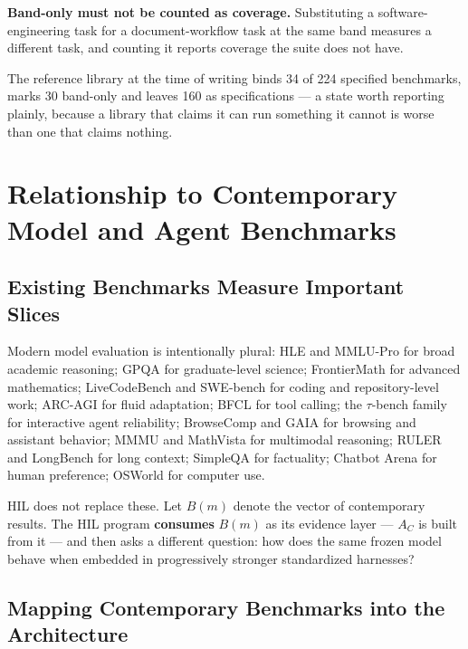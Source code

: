 \documentclass[11pt]{article}
\theoremstyle{definition}
\begin{document}
\textbf{Band-only must not be counted as coverage.} Substituting a software-engineering task for a document-workflow task at the same band measures a different task, and counting it reports coverage the suite does not have.

The reference library at the time of writing binds 34 of 224 specified benchmarks, marks 30 band-only and leaves 160 as specifications --- a state worth reporting plainly, because a library that claims it can run something it cannot is worse than one that claims nothing.

\section{Relationship to Contemporary Model and Agent Benchmarks}

\subsection{Existing Benchmarks Measure Important Slices}

Modern model evaluation is intentionally plural: HLE \citep{phan2025hle} and MMLU-Pro \citep{wang2024mmlupro} for broad academic reasoning; GPQA \citep{rein2023gpqa} for graduate-level science; FrontierMath \citep{glazer2024frontiermath} for advanced mathematics; LiveCodeBench \citep{jain2024livecodebench} and SWE-bench \citep{jimenez2023swebench} for coding and repository-level work; ARC-AGI \citep{arc2026} for fluid adaptation; BFCL \citep{patil2025bfcl} for tool calling; the $\tau$-bench family \citep{yao2024taubench} for interactive agent reliability; BrowseComp \citep{wei2025browsecomp} and GAIA \citep{mialon2023gaia} for browsing and assistant behavior; MMMU \citep{yue2023mmmu} and MathVista \citep{lu2023mathvista} for multimodal reasoning; RULER \citep{hsieh2024ruler} and LongBench \citep{bai2024longbench} for long context; SimpleQA \citep{openai2024simpleqa} for factuality; Chatbot Arena \citep{chiang2024arena} for human preference; OSWorld \citep{xie2024osworld} for computer use.

HIL does not replace these. Let $B(m)$ denote the vector of contemporary results. The HIL program \textbf{consumes} $B(m)$ as its evidence layer --- $A_C$ is built from it --- and then asks a different question: how does the same frozen model behave when embedded in progressively stronger standardized harnesses?

\subsection{Mapping Contemporary Benchmarks into the Architecture}
\end{document}
